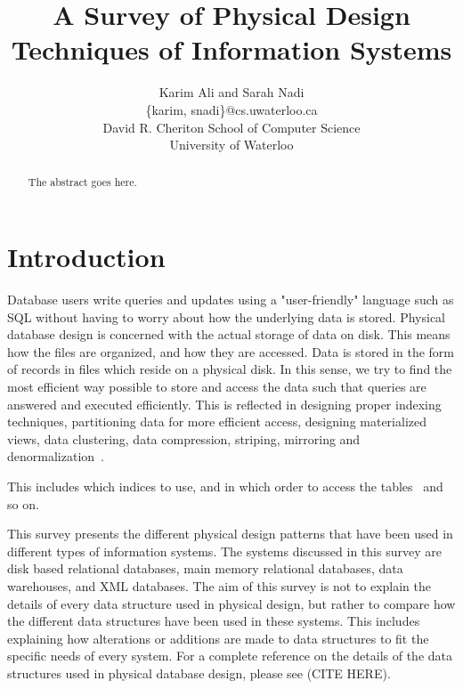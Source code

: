 \documentclass[12pt,a4paper]{article}
\begin{document}
\title{A Survey of Physical Design Techniques of Information Systems}


\author{Karim Ali and Sarah Nadi\\
\{karim, snadi\}@cs.uwaterloo.ca \\
David R. Cheriton School of Computer Science\\
University of Waterloo\\
}


\maketitle


\begin{abstract}
The abstract goes here.
\end{abstract}

\section{Introduction}

Database users write queries and updates using a "user-friendly" language such as SQL without having to worry about how the underlying data is stored. Physical
database design is concerned with the actual storage of data on disk. This means how the files are organized, and how they are accessed. Data is stored in the
form of records in files which reside on a physical disk. In this sense, we try to find the most efficient way possible to store and access the data such that
queries are answered and executed efficiently. This is reflected in designing proper indexing techniques, partitioning data for more efficient access, designing
materialized views, data clustering, data compression, striping, mirroring and denormalization~\cite{lightstone2007physical}. 

This includes which indices to use, and in which order to access the tables~\cite{finkelstein1988physical} and so on.

This survey presents the different physical design patterns that have been used in different types of information systems. The systems discussed in this survey
are disk based relational databases, main memory relational databases, data warehouses, and XML databases. The aim of this survey is not to explain the details
of every data structure used in physical design, but rather to compare how the different data structures have been used in these systems. This includes
explaining how alterations or additions are made to data structures to fit the specific needs of every system. For a complete reference on the details of the
data structures used in physical database design, please see (CITE HERE). 
\end{document}
